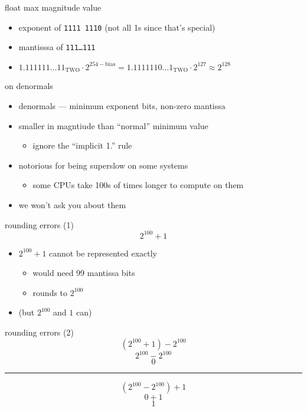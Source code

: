 \begin{frame}{float max magnitude value}
\begin{itemize}
\item exponent of {\tt 1111 1110}  (not all 1s since that's special) 
\item mantisssa of {\tt 111\ldots111}
\item $1.111111\ldots11_\text{TWO} \cdot 2^{254-\text{bias}} = 1.1111110\ldots1_\text{TWO} \cdot 2^{127} \approx 2^{128}$
\end{itemize}
\end{frame}

\begin{frame}{on denormals}
\begin{itemize}
\item denormals --- minimum exponent bits, non-zero mantissa
\item smaller in magntiude than ``normal'' minimum value
    \begin{itemize}
    \item ignore the ``implicit 1.'' rule
    \end{itemize}
\item notorious for being superslow on some systems
    \begin{itemize}
    \item some CPUs take 100s of times longer to compute on them
    \end{itemize}
\item we won't ask you about them
\end{itemize}
\end{frame}

\begin{frame}{rounding errors (1)}
\[
2^{100} + 1
\]
\begin{itemize}
\item $2^{100}+1$ cannot be represented exactly
    \begin{itemize}
    \item would need 99 mantissa bits
    \item rounds to $2^{100}$
    \end{itemize}
\item (but $2^{100}$ and $1$ can)
\end{itemize}
\end{frame}

\begin{frame}{rounding errors (2)}
\[
(2^{100} + 1) - 2^{100} 
\]
\[
2^{100} - 2^{100}
\]
\[
0
\]
\vspace{.25cm}
\hrule
\vspace{.25cm}
\[
(2^{100} - 2^{100}) + 1
\]
\[
0 + 1
\]
\[
1
\]
\end{frame}
